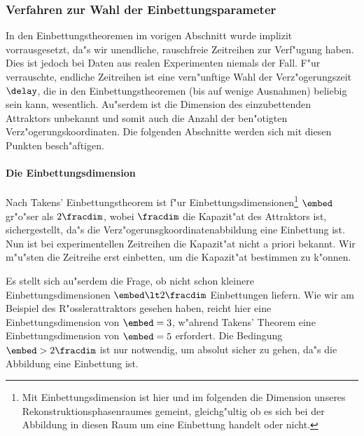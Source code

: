 
\subsubsection{Verfahren zur Wahl der Einbettungsparameter}

In den Einbettungstheoremen im vorigen Abschnitt wurde implizit vorrausgesetzt, da"s wir
unendliche, rauschfreie Zeitreihen zur Verf"ugung haben. Dies ist jedoch bei Daten aus
realen Experimenten niemals der Fall. F"ur verrauschte, endliche Zeitreihen ist eine
vern"unftige Wahl der Verz"ogerungszeit $\delay$, die in den Einbettungstheoremen (bis auf
wenige Ausnahmen) beliebig sein kann, wesentlich. Au"serdem ist die Dimension des
einzubettenden Attraktors unbekannt und somit auch die Anzahl der ben"otigten
Verz"ogerungskoordinaten. Die folgenden Abschnitte werden sich mit diesen Punkten
besch"aftigen.


\paragraph{Die Einbettungsdimension}

Nach Takens' Einbettungstheorem ist f"ur Einbettungsdimensionen\footnote{Mit
  Einbettungsdimension ist hier und im folgenden die Dimension unseres
  Rekonstruktionsphasenraumes gemeint, gleichg"ultig ob es sich bei der Abbildung in
  diesen Raum um eine Einbettung handelt oder nicht.} $\embed$ gr"o"ser als $2\fracdim$,
wobei $\fracdim$ die Kapazit"at des Attraktors ist, sichergestellt, da"s die
Verz"ogerunsgkoordinatenabbildung eine Einbettung ist. Nun ist bei experimentellen
Zeitreihen die Kapazit"at nicht a priori bekannt. Wir m"u"sten die Zeitreihe erst
einbetten, um die Kapazit"at bestimmen zu k"onnen.

Es stellt sich au"serdem die Frage, ob nicht schon kleinere Einbettungsdimensionen
$\embed\lt 2\fracdim$ Einbettungen liefern. Wie wir am Beispiel des R"osslerattraktors
gesehen haben, reicht hier eine Einbettungsdimension von $\embed=3$, w"ahrend Takens'
Theorem eine Einbettungsdimension von $\embed=5$ erfordert. Die Bedingung
$\embed>2\fracdim$ ist nur notwendig, um absolut sicher zu gehen, da"s die Abbildung eine
Einbettung ist.

